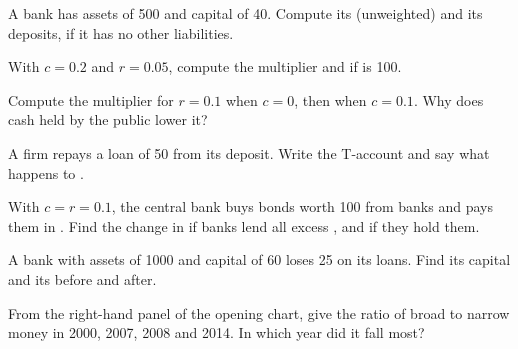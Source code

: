\begin{exercise}[$\star$]\label{exo:g11:money-and-banking:5}
A bank has assets of 500 and capital of 40. Compute its  (unweighted) and its deposits, if it has no other liabilities.
\end{exercise}

\begin{exercise}[$\star\star$]\label{exo:g11:money-and-banking:6}
With $c = 0.2$ and $r = 0.05$, compute the multiplier and  if  is 100.
\end{exercise}

\begin{exercise}[$\star\star$]\label{exo:g11:money-and-banking:7}
Compute the multiplier for $r = 0.1$ when $c = 0$, then when $c = 0.1$. Why does cash held by the public lower it?
\end{exercise}

\begin{exercise}[$\star\star$]\label{exo:g11:money-and-banking:8}
A firm repays a loan of 50 from its deposit. Write the T-account and say what happens to .
\end{exercise}

\begin{exercise}[$\star\star$]\label{exo:g11:money-and-banking:9}
With $c = r = 0.1$, the central bank buys bonds worth 100 from banks and pays them in . Find the change in  if banks lend all excess , and if
they hold them.
\end{exercise}

\begin{exercise}[$\star\star$]\label{exo:g11:money-and-banking:10}
A bank with assets of 1000 and capital of 60 loses 25 on its loans. Find its capital and its  before and after.
\end{exercise}

\begin{exercise}[$\star\star$]\label{exo:g11:money-and-banking:11}
From the right-hand panel of the opening chart, give the ratio of broad to narrow money in 2000, 2007, 2008 and 2014. In which year did it fall most?
\end{exercise}

